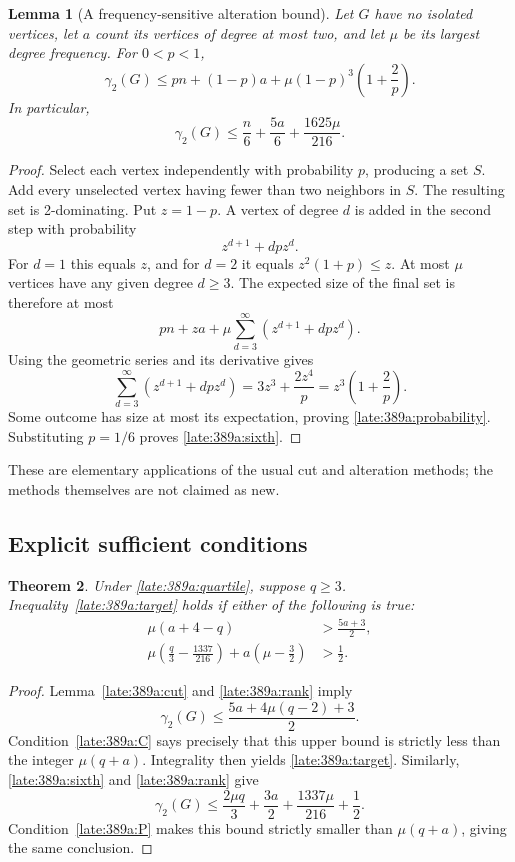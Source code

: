 \documentclass[11pt,a4paper]{article}
\newtheorem{theorem}{Theorem}[section]
\newtheorem{lemma}[theorem]{Lemma}
\theoremstyle{definition}\newtheorem{definition}[theorem]{Definition}
\theoremstyle{remark}\newtheorem{remark}[theorem]{Remark}
\begin{document}
\begin{lemma}[A frequency-sensitive alteration bound]\label{late:389a:random}
Let $G$ have no isolated vertices, let $a$ count its vertices of degree at
most two, and let $\mu$ be its largest degree frequency. For $0<p<1$,
\begin{equation}\label{late:389a:probability}
 \gamma_2(G)\le pn+(1-p)a+
 \mu(1-p)^3\left(1+\frac2p\right).
\end{equation}
In particular,
\begin{equation}\label{late:389a:sixth}
 \gamma_2(G)\le\frac n6+\frac{5a}{6}+\frac{1625\mu}{216}.
\end{equation}
\end{lemma}
\begin{proof}
Select each vertex independently with probability $p$, producing a set
$S$. Add every unselected vertex having fewer than two neighbors in $S$.
The resulting set is 2-dominating. Put $z=1-p$. A vertex of degree $d$
is added in the second step with probability
\[
 z^{d+1}+dpz^d.
\]
For $d=1$ this equals $z$, and for $d=2$ it equals
$z^2(1+p)\le z$. At most $\mu$ vertices have any given degree $d\ge3$.
The expected size of the final set is therefore at most
\[
 pn+za+\mu\sum_{d=3}^{\infty}(z^{d+1}+dpz^d).
\]
Using the geometric series and its derivative gives
\[
 \sum_{d=3}^{\infty}(z^{d+1}+dpz^d)
 =3z^3+\frac{2z^4}{p}
 =z^3\left(1+\frac2p\right).
\]
Some outcome has size at most its expectation, proving
\eqref{late:389a:probability}. Substituting $p=1/6$ proves
\eqref{late:389a:sixth}.
\end{proof}
These are elementary applications of the usual cut and alteration
methods; the methods themselves are not claimed as new.

\subsection{Explicit sufficient conditions}
\begin{theorem}\label{late:389a:criteria}
Under \eqref{late:389a:quartile}, suppose $q\ge3$.
Inequality~\eqref{late:389a:target} holds if either of the following is true:
\begin{align}
 \mu(a+4-q)&>\frac{5a+3}{2},\label{late:389a:C}\\
 \mu\left(\frac q3-\frac{1337}{216}\right)
       +a\left(\mu-\frac32\right)&>\frac12.
       \label{late:389a:P}
\end{align}
\end{theorem}
\begin{proof}
Lemma~\ref{late:389a:cut} and \eqref{late:389a:rank} imply
\[
 \gamma_2(G)\le\frac{5a+4\mu(q-2)+3}{2}.
\]
Condition~\eqref{late:389a:C} says precisely that this upper bound is
strictly less than the integer $\mu(q+a)$. Integrality then yields
\eqref{late:389a:target}. Similarly, \eqref{late:389a:sixth} and
\eqref{late:389a:rank} give
\begin{equation}\label{late:389a:rankprob}
 \gamma_2(G)\le\frac{2\mu q}{3}+\frac{3a}{2}
                     +\frac{1337\mu}{216}+\frac12.
\end{equation}
Condition~\eqref{late:389a:P} makes this bound strictly smaller than
$\mu(q+a)$, giving the same conclusion.
\end{proof}
\end{document}
